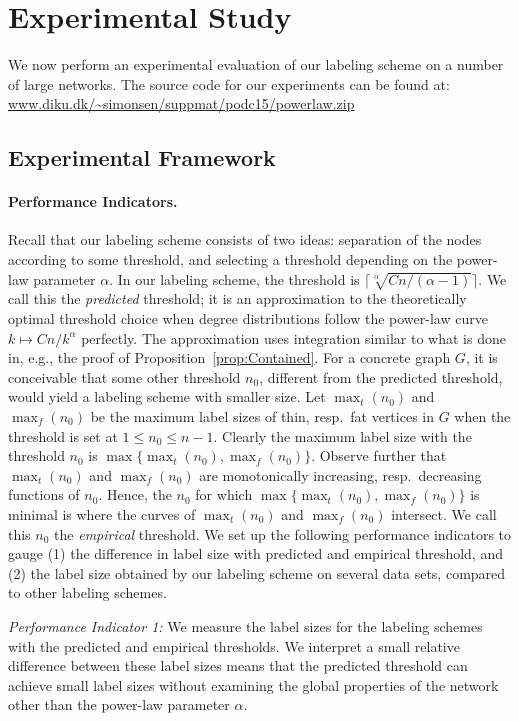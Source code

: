 \section{Experimental Study}

We now  perform an experimental evaluation of our labeling scheme on a number of large networks.
The source code for our experiments can be found at: \url{www.diku.dk/\~simonsen/suppmat/podc15/powerlaw.zip}

\subsection{Experimental Framework}\label{Sec:Experimental}
\paragraph{Performance Indicators.}
Recall that our labeling scheme consists of two ideas: separation of the nodes according to some threshold, and selecting a threshold depending on the power-law parameter $\alpha$.
In our labeling scheme, the threshold  is $\lceil \sqrt[\alpha]{C n/(\alpha-1)} \rceil$. We call this the \emph{predicted} threshold; it is an approximation to the theoretically optimal threshold choice when degree distributions follow the power-law curve $k\mapsto Cn/k^\alpha$ perfectly. The approximation uses integration similar to what is done in, e.g., the proof of Proposition~\ref{prop:Contained}.
For a concrete
graph $G$, it is conceivable that some other threshold $n_0$, different from the predicted threshold, would yield a labeling scheme with smaller size. 
Let $\max_t(n_0)$ and $\max_f(n_0)$ be the maximum label sizes of thin, resp.\ fat vertices in $G$ when the threshold is set at $1 \leq n_0 \leq n-1$. Clearly
the maximum label size with the threshold $n_0$ is $\max\{\max_t(n_0),\max_f(n_0)\}$. Observe further
that $\max_t(n_0)$ and $\max_f(n_0)$ are monotonically increasing, resp.\ decreasing functions of $n_0$. Hence,
the $n_0$ for which $\max\{\max_t(n_0),\max_f(n_0)\}$ is minimal is where the curves of $\max_t(n_0)$ and $\max_f(n_0)$ intersect. We call this $n_0$ the \emph{empirical} threshold.
We set up the following performance indicators to gauge (1) the difference in label size with predicted and empirical threshold, and (2) the label size obtained by our labeling scheme on several data sets, compared to other labeling schemes.

\emph{Performance Indicator 1:} We measure the label sizes for the labeling schemes with the predicted and empirical thresholds. We interpret a small relative difference between these label sizes means that the predicted threshold can achieve small label sizes without examining the global properties of the network other than the power-law parameter $\alpha$. 
 
